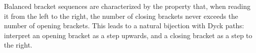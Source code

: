 

\setcounter{section}{4}
\setcounter{subsection}{6}
\setcounter{dfn}{9}

Balanced bracket sequences are characterized by the property that,
when reading it from the left to the right, the number of closing brackets never exceeds the number of opening brackets.
This leads to a natural bijection with Dyck paths: interpret an opening bracket as a step upwards, and a closing bracket as a step to the right.



